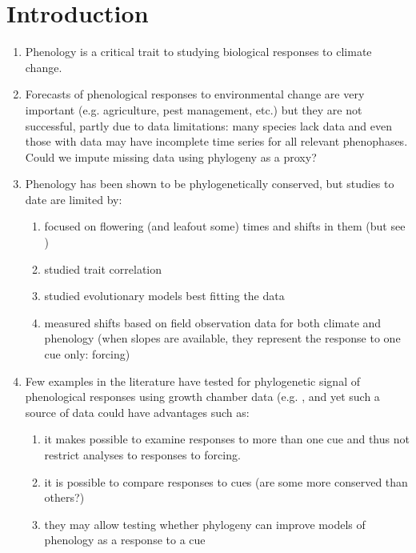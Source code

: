 \documentclass{article}\usepackage[]{graphicx}\usepackage[]{color}
\begin{document}




\section*{Introduction}
\begin{enumerate}
\item Phenology is a critical trait to studying biological responses to climate change.
\item Forecasts of phenological responses to environmental change are very important (e.g. agriculture, pest management, etc.) but they are not successful, partly due to data limitations: many species lack data and even those with data may have incomplete time series for all relevant phenophases. Could we impute missing data using phylogeny as a proxy? 
\item Phenology has been shown to be phylogenetically conserved, but studies to date are limited by:
\begin{enumerate}
\item focused on flowering (and leafout some) times and shifts in them (but see \cite{joly2019importance})
\item studied trait correlation \citep{bolmgren2008time}
\item studied evolutionary models best fitting the data \citep{rafferty2017global}
\item measured shifts based on field observation data for both climate and phenology (when slopes are available, they represent the response to one cue only: forcing)
\end{enumerate}
\item Few examples in the literature have tested for phylogenetic signal of phenological responses using growth chamber data (e.g. \cite{joly2019importance}, and yet such a source of data could have advantages such as:
\begin{enumerate}
\item it makes possible to examine responses to more than one cue and thus not restrict analyses to responses to forcing.
\item it is possible to compare responses to cues (are some more conserved than others?) 
\item they may allow testing whether phylogeny can improve models of phenology as a response to a cue
\end{enumerate}
\end{enumerate}
\end{document}
